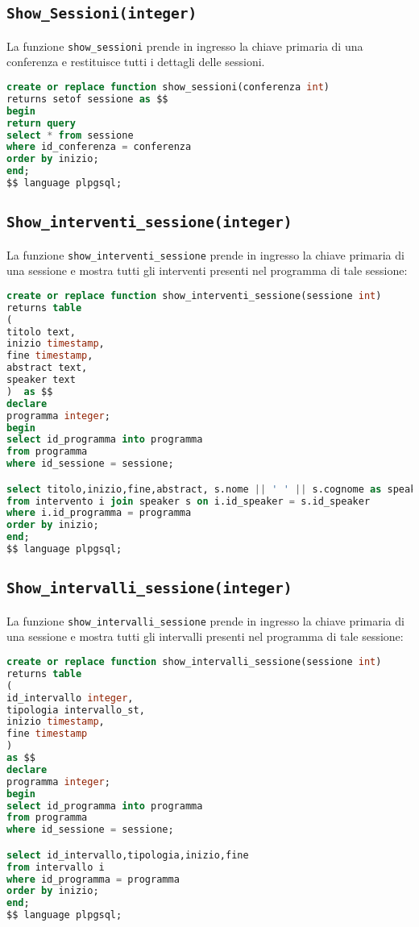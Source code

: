 \subsection{\texttt{Show\_Sessioni(integer)}}
La funzione \texttt{show\_sessioni} prende in ingresso la chiave primaria di una conferenza e restituisce tutti i dettagli delle sessioni.
\begin{lstlisting}[language=SQL, style=mystyle]
create or replace function show_sessioni(conferenza int)
returns setof sessione as $$
begin
return query
select * from sessione
where id_conferenza = conferenza
order by inizio;
end;
$$ language plpgsql;
\end{lstlisting}
\subsection{\texttt{Show\_interventi\_sessione(integer)}}
La funzione \texttt{show\_interventi\_sessione} prende in ingresso la chiave primaria di una sessione e mostra tutti gli interventi presenti nel programma di tale sessione:
\begin{lstlisting}[language=SQL,style=mystyle]
create or replace function show_interventi_sessione(sessione int)
returns table
(
titolo text,
inizio timestamp,
fine timestamp,
abstract text,
speaker text
)  as $$
declare 
programma integer;
begin
select id_programma into programma
from programma
where id_sessione = sessione;

select titolo,inizio,fine,abstract, s.nome || ' ' || s.cognome as speaker
from intervento i join speaker s on i.id_speaker = s.id_speaker
where i.id_programma = programma
order by inizio;
end;
$$ language plpgsql;
\end{lstlisting}

\subsection{\texttt{Show\_intervalli\_sessione(integer)}}
La funzione \texttt{show\_intervalli\_sessione} prende in ingresso la chiave primaria di una sessione e mostra tutti gli intervalli presenti nel programma di tale sessione:
\begin{lstlisting}[language=SQL,style=mystyle]
create or replace function show_intervalli_sessione(sessione int)
returns table
(
id_intervallo integer,
tipologia intervallo_st,
inizio timestamp,
fine timestamp
)  
as $$
declare 
programma integer;
begin
select id_programma into programma
from programma
where id_sessione = sessione;

select id_intervallo,tipologia,inizio,fine
from intervallo i
where id_programma = programma
order by inizio;
end;
$$ language plpgsql;
\end{lstlisting}
